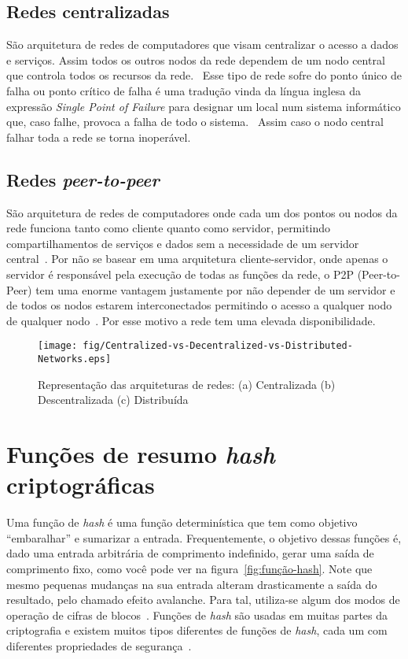 \subsection{Redes centralizadas}

São arquitetura de redes de computadores que visam centralizar o acesso a dados e serviços.
Assim todos os outros nodos da rede dependem de um nodo central que controla todos os recursos da rede.~\cite{wiki:modelorede}
Esse tipo de rede sofre do ponto único de falha ou ponto crítico de falha é uma tradução vinda da língua inglesa da expressão \textit{Single Point of Failure} para designar um local num sistema informático que, caso falhe, provoca a falha de todo o sistema.~\cite{wiki:modelorede}
Assim caso o nodo central falhar toda a rede se torna inoperável.

\subsection{Redes \textit{peer-to-peer}}

São arquitetura de redes de computadores onde cada um dos pontos ou nodos da rede funciona tanto como cliente quanto como servidor, permitindo compartilhamentos de serviços e dados sem a necessidade de um servidor central~\cite{wiki:modelorede}.
Por não se basear em uma arquitetura cliente-servidor, onde apenas o servidor é responsável pela execução de todas as funções da rede, o P2P (Peer-to-Peer) tem uma enorme vantagem justamente por não depender de um servidor e de todos os nodos estarem interconectados permitindo o acesso a qualquer nodo de qualquer nodo~\cite{wiki:modelorede}.
Por esse motivo a rede tem uma elevada disponibilidade.%

\begin{figure}[htb!]
    \centering
    \texttt{[image: fig/Centralized-vs-Decentralized-vs-Distributed-Networks.eps]}
    \caption[Representação das arquiteturas de redes]{\label{fig:tipos-de-redes}
        Representação das arquiteturas de redes: (a) Centralizada (b) Descentralizada (c) Distribuída~\cite{Imagem1}
    }%
\end{figure}


\section{Funções de resumo \textit{hash} criptográficas}

Uma função de \textit{hash} é uma função determinística que tem como objetivo ``embaralhar'' e sumarizar a entrada.
Frequentemente, o objetivo dessas funções é, dado uma entrada arbitrária de comprimento indefinido, gerar uma saída de comprimento fixo, como você pode ver na figura~\ref{fig:função-hash}.
Note que mesmo pequenas mudanças na sua entrada alteram drasticamente a saída do resultado, pelo chamado efeito avalanche.
Para tal, utiliza-se algum dos modos de operação de cifras de blocos~\cite{wiki:cifras}.
Funções de \textit{hash} são usadas em muitas partes da criptografia e existem muitos tipos diferentes de funções de \textit{hash}, cada um com diferentes propriedades de segurança~\cite{HASH1}.

